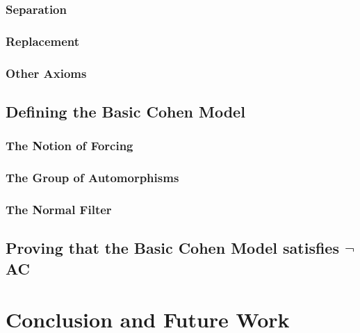 \documentclass{report}
\begin{document}
\subsection{Separation}
\subsection{Replacement}
\subsection{Other Axioms}

\section{Defining the Basic Cohen Model}
\subsection{The Notion of Forcing}
\subsection{The Group of Automorphisms}
\subsection{The Normal Filter}

\section{Proving that the Basic Cohen Model satisfies $\neg$AC}

\chapter{Conclusion and Future Work}


  
\printbibliography
\end{document}

